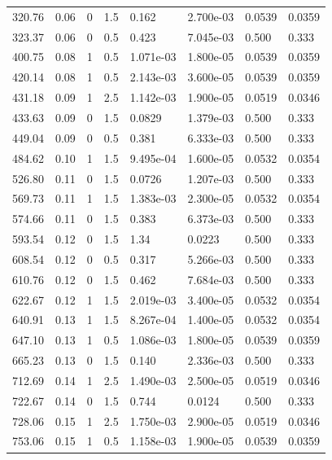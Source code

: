 \documentclass[preview]{standalone}
\begin{document}
{{\begin{tabular}{L{1.2cm}C{1.2cm} C{0.3cm}C{0.5cm} C{1.4cm}C{1.4cm} C{1.4cm}C{1.4cm}}
  320.76  &  0.06  & 0     & 1.5 &  0.162  & 2.700e-03  & 0.0539 &  0.0359   \\ 
  323.37  &  0.06  & 0     & 0.5 &  0.423  & 7.045e-03  & 0.500 &  0.333   \\ 
  400.75  &  0.08  & 1     & 0.5 &  1.071e-03  & 1.800e-05  & 0.0539 &  0.0359   \\ 
  420.14  &  0.08  & 1     & 0.5 &  2.143e-03  & 3.600e-05  & 0.0539 &  0.0359   \\ 
  431.18  &  0.09  & 1     & 2.5 &  1.142e-03  & 1.900e-05  & 0.0519 &  0.0346   \\ 
  433.63  &  0.09  & 0     & 1.5 &  0.0829  & 1.379e-03  & 0.500 &  0.333   \\ 
  449.04  &  0.09  & 0     & 0.5 &  0.381  & 6.333e-03  & 0.500 &  0.333   \\ 
  484.62  &  0.10  & 1     & 1.5 &  9.495e-04  & 1.600e-05  & 0.0532 &  0.0354   \\ 
  526.80  &  0.11  & 0     & 1.5 &  0.0726  & 1.207e-03  & 0.500 &  0.333   \\ 
  569.73  &  0.11  & 1     & 1.5 &  1.383e-03  & 2.300e-05  & 0.0532 &  0.0354   \\ 
  574.66  &  0.11  & 0     & 1.5 &  0.383  & 6.373e-03  & 0.500 &  0.333   \\ 
  593.54  &  0.12  & 0     & 1.5 &  1.34  & 0.0223  & 0.500 &  0.333   \\ 
  608.54  &  0.12  & 0     & 0.5 &  0.317  & 5.266e-03  & 0.500 &  0.333   \\ 
  610.76  &  0.12  & 0     & 1.5 &  0.462  & 7.684e-03  & 0.500 &  0.333   \\ 
  622.67  &  0.12  & 1     & 1.5 &  2.019e-03  & 3.400e-05  & 0.0532 &  0.0354   \\ 
  640.91  &  0.13  & 1     & 1.5 &  8.267e-04  & 1.400e-05  & 0.0532 &  0.0354   \\ 
  647.10  &  0.13  & 1     & 0.5 &  1.086e-03  & 1.800e-05  & 0.0539 &  0.0359   \\ 
  665.23  &  0.13  & 0     & 1.5 &  0.140  & 2.336e-03  & 0.500 &  0.333   \\ 
  712.69  &  0.14  & 1     & 2.5 &  1.490e-03  & 2.500e-05  & 0.0519 &  0.0346   \\ 
  722.67  &  0.14  & 0     & 1.5 &  0.744  & 0.0124  & 0.500 &  0.333   \\ 
  728.06  &  0.15  & 1     & 2.5 &  1.750e-03  & 2.900e-05  & 0.0519 &  0.0346   \\ 
  753.06  &  0.15  & 1     & 0.5 &  1.158e-03  & 1.900e-05  & 0.0539 &  0.0359   \\ 

\end{tabular}}}
\end{document}
